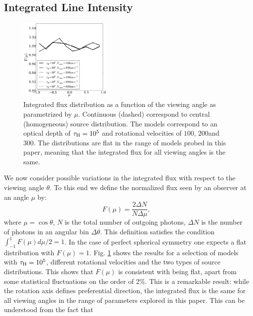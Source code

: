\subsection{Integrated Line Intensity}
\label{sec:intlineint}
\begin{figure}
\begin{center}
\includegraphics[width=0.4\textwidth]{../Figures/f5.pdf}
\end{center}
\caption{Integrated flux distribution as a function of the
viewing angle as parametrized by $\mu$. Continuous (dashed)
correspond to central (homogeneous) source distribution.
The models correspond to an optical depth of $\tau_{\rm
H}=10^5$ and rotational velocities of $100$\kms, $200$\kms and
$300$\kms. The distributions are flat in the range of models probed
in this paper, meaning that the integrated flux for all viewing
angles is the same.
\label{fig:muhisto}}
\end{figure}
We now consider possible variations in the integrated flux with
respect to the viewing angle $\theta$.
To this end we define the normalized flux seen by an observer at an
angle $\mu$ by:
\begin{equation}
F(\mu) = \frac{2\Delta N}{N\Delta \mu},
\end{equation}
%
where $\mu=\cos\theta$, $N$ is the total number of outgoing photons,
$\Delta N$ is the number of photons in an angular bin $\Delta
\theta$. This definition satisfies the condition
$\int_{-1}^{1}F(\mu)d\mu/2=1$. In the case of perfect spherical
symmetry one expects a flat distribution with $F(\mu)=1$.
Fig. \ref{fig:muhisto} shows the results for a selection of models
with $\tau_{\rm H}=10^{5}$, different rotational velocities and the two
types of source distributions. This shows that $F(\mu)$ is consistent with being flat, apart
from some statistical fluctuations on the order of 2\%.
This is a remarkable result: while the rotation axis defines preferential direction, the
integrated flux is the same for all viewing angles in the range of parameters explored in this paper. This can be understood from the fact that
